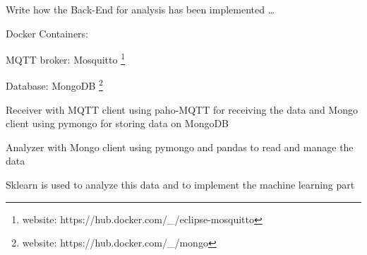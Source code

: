 Write how the Back-End for analysis has been implemented \dots

Docker Containers:

MQTT broker: Mosquitto \footnote{ website: https://hub.docker.com/\_/eclipse-mosquitto }

Database: MongoDB \footnote{ website: https://hub.docker.com/\_/mongo }

Receiver with MQTT client using paho-MQTT for receiving the data and Mongo client using pymongo for storing data on MongoDB

Analyzer with Mongo client using pymongo and pandas to read and manage the data

Sklearn is used to analyze this data and to implement the machine learning part
